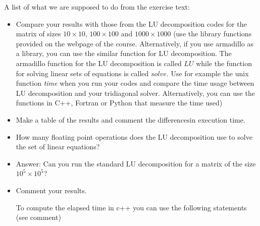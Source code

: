 
A list of what we are supposed to do from the exercise text:

\begin{itemize}

\item Compare your results with those from the LU decomposition codes for the matrix of sizes $10\times 10$, $100\times 100$ and
$1000\times 1000$ (use the library functions provided  on the webpage of the course. Alternatively, if you use armadillo as a library, you can use the similar function for LU decomposition.  The armadillo function for the LU decomposition is called $LU$ while the function for solving linear sets of equations is called $solve$.
Use for example the unix function \emph{time} when you run your codes and compare the time usage between LU decomposition and your tridiagonal solver. Alternatively, you can use the functions in C++, Fortran or Python that measure the time used)

\item Make a table of the results and comment the differencesin execution time.

\item How many floating point operations does the LU decomposition use to solve the set of linear equations?

\item Answer: Can you run the standard LU decomposition
for a matrix of the size $10^5\times 10^5$?

\item Comment your results.

To compute the elapsed time in c++ you can use the following statements (see comment)
\end{itemize}
